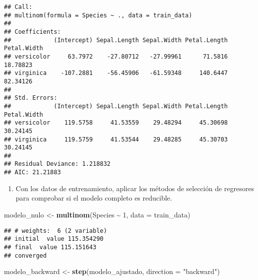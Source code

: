 \documentclass[
]{article}
\newenvironment{Shaded}{\begin{snugshade}}{\end{snugshade}}
\newcommand{\AttributeTok}[1]{\textcolor[rgb]{0.13,0.29,0.53}{#1}}
\newcommand{\DecValTok}[1]{\textcolor[rgb]{0.00,0.00,0.81}{#1}}
\newcommand{\FunctionTok}[1]{\textcolor[rgb]{0.13,0.29,0.53}{\textbf{#1}}}
\newcommand{\NormalTok}[1]{#1}
\newcommand{\OtherTok}[1]{\textcolor[rgb]{0.56,0.35,0.01}{#1}}
\newcommand{\SpecialCharTok}[1]{\textcolor[rgb]{0.81,0.36,0.00}{\textbf{#1}}}
\newcommand{\StringTok}[1]{\textcolor[rgb]{0.31,0.60,0.02}{#1}}
\providecommand{\tightlist}{%
  \setlength{\itemsep}{0pt}\setlength{\parskip}{0pt}}
\begin{document}
\begin{verbatim}
## Call:
## multinom(formula = Species ~ ., data = train_data)
## 
## Coefficients:
##            (Intercept) Sepal.Length Sepal.Width Petal.Length Petal.Width
## versicolor     63.7972    -27.80712   -27.99961      71.5816    18.78823
## virginica    -107.2881    -56.45906   -61.59348     140.6447    82.34126
## 
## Std. Errors:
##            (Intercept) Sepal.Length Sepal.Width Petal.Length Petal.Width
## versicolor    119.5758     41.53559    29.48294     45.30698    30.24145
## virginica     119.5759     41.53544    29.48285     45.30703    30.24145
## 
## Residual Deviance: 1.218832 
## AIC: 21.21883
\end{verbatim}

\begin{enumerate}
\def\labelenumi{\arabic{enumi})}
\setcounter{enumi}{3}
\tightlist
\item
  Con los datos de entrenamiento, aplicar los métodos de selección de
  regresores para comprobar si el modelo completo es reducible.
\end{enumerate}

\begin{Shaded}
\begin{Highlighting}[]
\NormalTok{modelo\_nulo }\OtherTok{\textless{}{-}} \FunctionTok{multinom}\NormalTok{(Species }\SpecialCharTok{\textasciitilde{}} \DecValTok{1}\NormalTok{, }\AttributeTok{data =}\NormalTok{ train\_data)}
\end{Highlighting}
\end{Shaded}

\begin{verbatim}
## # weights:  6 (2 variable)
## initial  value 115.354290 
## final  value 115.151643 
## converged
\end{verbatim}

\begin{Shaded}
\begin{Highlighting}[]
\NormalTok{modelo\_backward }\OtherTok{\textless{}{-}} \FunctionTok{step}\NormalTok{(modelo\_ajustado, }\AttributeTok{direction =} \StringTok{"backward"}\NormalTok{)}
\end{Highlighting}
\end{Shaded}
\end{document}
